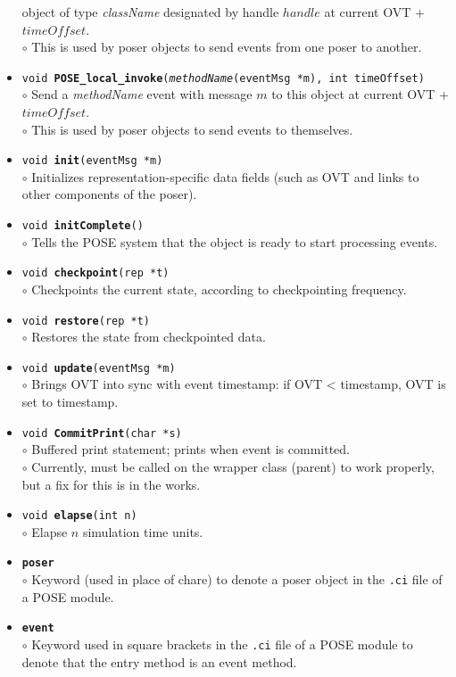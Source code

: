\documentclass[10pt]{article}
\begin{document}
\begin{itemize}
	object of type {\it className} designated by handle $handle$
	at current OVT + $timeOffset$.\\
	$\circ$ This is used by poser objects to send events from one
	poser to another.
\item {\tt void {\bf POSE\_local\_invoke}({\it methodName}(eventMsg
	*m), int timeOffset)}\\
	$\circ$ Send a {\it methodName} event with message $m$ to this
	object at current OVT + $timeOffset$.\\
	$\circ$ This is used by poser objects to send events to themselves.
\item {\tt void {\bf init}(eventMsg *m)}\\
	$\circ$ Initializes representation-specific data fields (such
	as OVT and links to other components of the poser).
\item {\tt void {\bf initComplete}()}\\
	$\circ$ Tells the POSE system that the object is ready to
	start processing events.
\item {\tt void {\bf checkpoint}(rep *t)}\\
	$\circ$ Checkpoints the current state, according to
	checkpointing frequency.
\item {\tt void {\bf restore}(rep *t)}\\
	$\circ$ Restores the state from checkpointed data.
\item {\tt void {\bf update}(eventMsg *m)}\\
	$\circ$ Brings OVT into sync with event timestamp: if OVT <
	timestamp, OVT is set to timestamp.
\item {\tt void {\bf CommitPrint}(char *s)}\\
	$\circ$ Buffered print statement; prints when event is
	committed.\\
	$\circ$ Currently, must be called on the wrapper class
	(parent) to work properly, but a fix for this is in the works.
\item {\tt void {\bf elapse}(int n)}\\
	$\circ$ Elapse $n$ simulation time units.
\item {\tt {\bf poser}}\\
	$\circ$ Keyword (used in place of chare) to denote a poser
	object in the {\tt .ci} file of a POSE module.
\item {\tt {\bf event}}\\
	$\circ$ Keyword used in square brackets in the {\tt .ci} file
	of a POSE module to denote that the entry method is an event method.

\end{itemize}
\end{document}
